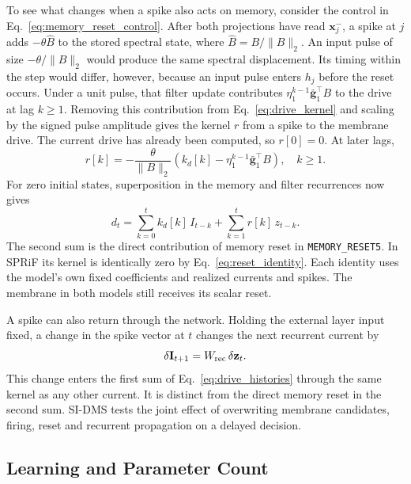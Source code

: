 \documentclass[letterpaper,journal]{IEEEtran}
\newcommand{\mr}{\textnormal{\texttt{MEMORY\_RESET5}}}
\begin{document}
To see what changes when a spike also acts on memory, consider the control in Eq.~\eqref{eq:memory_reset_control}. After both projections have read $\mathbf x_j^-$, a spike at $j$ adds $-\theta\widehat B$ to the stored spectral state, where $\widehat B=B/\|B\|_2$. An input pulse of size $-\theta/\|B\|_2$ would produce the same spectral displacement. Its timing within the step would differ, however, because an input pulse enters $h_j$ before the reset occurs. Under a unit pulse, that filter update contributes $\eta_1^{k-1}\bar{\mathbf g}_1^\top B$ to the drive at lag $k\geq1$. Removing this contribution from Eq.~\eqref{eq:drive_kernel} and scaling by the signed pulse amplitude gives the kernel $r$ from a spike to the membrane drive. The current drive has already been computed, so $r[0]=0$. At later lags,
\begin{equation}
r[k]=-\frac{\theta}{\|B\|_2}
\left(k_d[k]-\eta_1^{k-1}\bar{\mathbf g}_1^\top B\right),
\quad k\geq1 .
\label{eq:reset_kernel}
\end{equation}
For zero initial states, superposition in the memory and filter recurrences now gives
\begin{equation}
d_t=\sum_{k=0}^{t} k_d[k]\,I_{t-k}
    +\sum_{k=1}^{t} r[k]\,z_{t-k}.
\label{eq:drive_histories}
\end{equation}
The second sum is the direct contribution of memory reset in \mr{}. In SPRiF its kernel is identically zero by Eq.~\eqref{eq:reset_identity}. Each identity uses the model's own fixed coefficients and realized currents and spikes. The membrane in both models still receives its scalar reset.

A spike can also return through the network. Holding the external layer input fixed, a change in the spike vector at $t$ changes the next recurrent current by
\begin{equation}
\delta\mathbf I_{t+1}=W_{\rm rec}\,\delta\mathbf z_t .
\label{eq:recurrent_feedback}
\end{equation}
This change enters the first sum of Eq.~\eqref{eq:drive_histories} through the same kernel as any other current. It is distinct from the direct memory reset in the second sum. SI-DMS tests the joint effect of overwriting membrane candidates, firing, reset and recurrent propagation on a delayed decision.

\subsection{Learning and Parameter Count}
\label{sec:learning}
\end{document}

